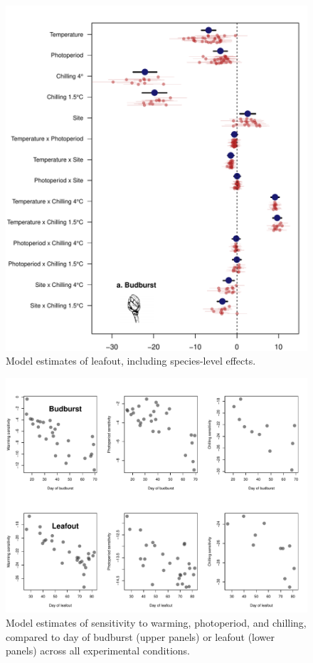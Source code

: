 \documentclass{article}
\begin{document}
\clearpage

\begin{figure}
\caption{Model estimates of leafout, including species-level effects.}
\label{figS3}
\includegraphics[scale=0.75, page=2]{Fig1_bb_lo+sp}
\end{figure}

\begin{figure}
\caption{Model estimates of sensitivity to warming, photoperiod, and chilling, compared to day of budburst (upper panels) or leafout (lower panels) across all experimental conditions.}
\label{figS4}
\includegraphics[scale=0.75]{Sens_vs_day}
\end{figure}
\end{document}
